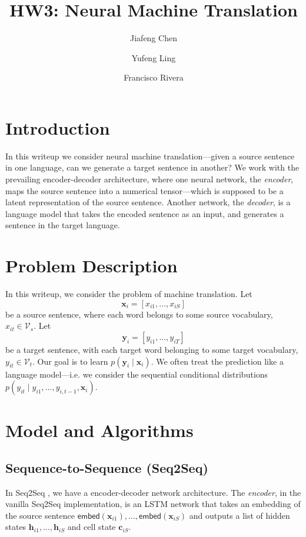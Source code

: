 \documentclass[12pt]{article}
\title{HW3: Neural Machine Translation}
\author{Jiafeng Chen \and Yufeng Ling \and
Francisco Rivera}
\newcommand{\sts}{Seq2Seq}
\newcommand{\embed}{\mathsf{embed}}
\begin{document}
\maketitle

\section{Introduction}
In this writeup we consider neural machine translation---given a source sentence in one language, can we generate a target sentence in another? We work with the prevailing encoder-decoder architecture, where one neural network, the \emph{encoder}, maps the source sentence into a numerical tensor---which is supposed to be a latent representation of the source sentence. Another network, the \emph{decoder}, is a language model that takes the encoded sentence as an input, and generates a sentence in the target language. 

\section{Problem Description}
In this writeup, we consider the problem of machine translation. Let \[\bm x_i = [x_{i1},\ldots,x_{iS}]\] be a source sentence, where each word belongs to some source vocabulary, $x_{it} \in \mathcal V_s$. Let \[\bm y_i = [y_{i1},\ldots,y_{iT}]\] be a target sentence, with each target word belonging to some target vocabulary, $y_{it} \in \mathcal V_t$. Our goal is to learn $p(\bm y_i \mid \bm x_i)$. We often treat the prediction like a language model---i.e. we consider the sequential conditional distributions $p(y_{it} \mid y_{i1},\ldots,y_{i,t-1}, \bm x_i)$.


\section{Model and Algorithms}

\subsection{Sequence-to-Sequence (\sts)}
\label{sub:seq2seq}
In \sts{} , we have a encoder-decoder network architecture. The \emph{encoder}, in the vanilla \sts{} implementation, is an LSTM network that takes an embedding of the source sentence $\embed(\bm x_{i1}),\ldots,\embed(\bm x_{iS})$ and outputs a list of hidden states $\bm h_{i1},\ldots, \bm h_{iS}$ and cell state $\bm c_{iS}$.
\end{document}
